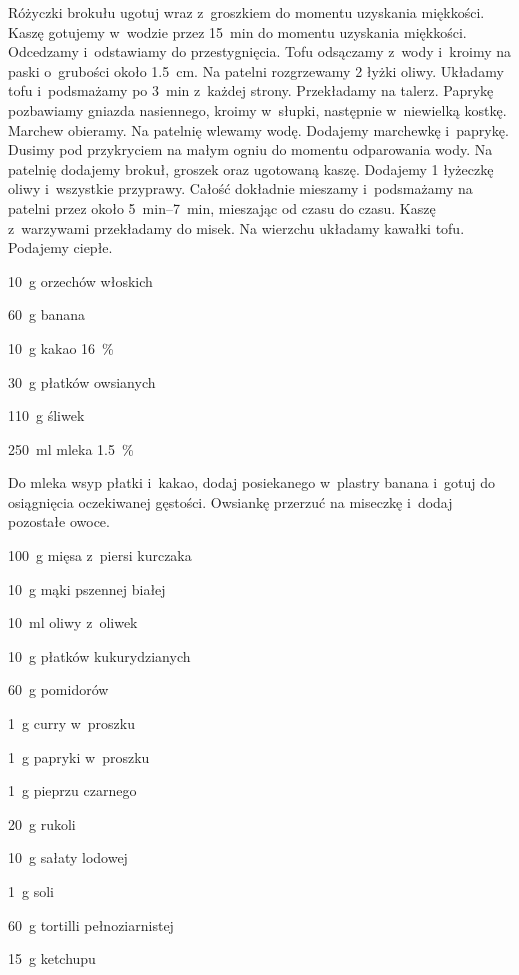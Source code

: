 \documentclass[../kucharek.tex]{subfiles}
\begin{document}
Różyczki brokułu ugotuj wraz z~groszkiem do momentu uzyskania miękkości. Kaszę
gotujemy w~wodzie przez \qty{15}{\minute} do momentu uzyskania miękkości.
Odcedzamy i~odstawiamy do przestygnięcia. Tofu odsączamy z~wody i~kroimy na
paski o~grubości około \qty{1.5}{\centi\metre}. Na patelni rozgrzewamy \num{2}
łyżki oliwy. Układamy tofu i~podsmażamy po \qty{3}{\minute} z~każdej strony.
Przekładamy na talerz. Paprykę pozbawiamy gniazda nasiennego, kroimy w~słupki,
następnie w~niewielką kostkę. Marchew obieramy. Na patelnię wlewamy wodę.
Dodajemy marchewkę i~paprykę. Dusimy pod przykryciem na małym ogniu do momentu
odparowania wody. Na patelnię dodajemy brokuł, groszek oraz ugotowaną kaszę.
Dodajemy \num{1} łyżeczkę oliwy i~wszystkie przyprawy. Całość dokładnie
mieszamy i~podsmażamy na patelni przez około \qtyrange{5}{7}{\minute},
mieszając od czasu do czasu. Kaszę z~warzywami przekładamy do misek. Na
wierzchu układamy kawałki tofu. Podajemy ciepłe.


\begin{Ingred}
    \item \qty{10}{\gram} orzechów włoskich
    \item \qty{60}{\gram} banana
    \item \qty{10}{\gram} kakao \qty{16}{\percent}
    \item \qty{30}{\gram} płatków owsianych
    \item \qty{110}{\gram} śliwek
    \item \qty{250}{\milli\litre} mleka \qty{1.5}{\percent}
\end{Ingred}

Do mleka wsyp płatki i~kakao, dodaj posiekanego w~plastry banana i~gotuj do
osiągnięcia oczekiwanej gęstości. Owsiankę przerzuć na miseczkę i~dodaj
pozostałe owoce.


\begin{Ingred}
    \item \qty{100}{\gram} mięsa z~piersi kurczaka
    \item \qty{10}{\gram} mąki pszennej białej
    \item \qty{10}{\milli\litre} oliwy z~oliwek
    \item \qty{10}{\gram} płatków kukurydzianych
    \item \qty{60}{\gram} pomidorów
    \item \qty{1}{\gram} curry w~proszku
    \item \qty{1}{\gram} papryki w~proszku
    \item \qty{1}{\gram} pieprzu czarnego
    \item \qty{20}{\gram} rukoli
    \item \qty{10}{\gram} sałaty lodowej
    \item \qty{1}{\gram} soli
    \item \qty{60}{\gram} tortilli pełnoziarnistej
    \item \qty{15}{\gram} ketchupu
\end{Ingred}
\end{document}
